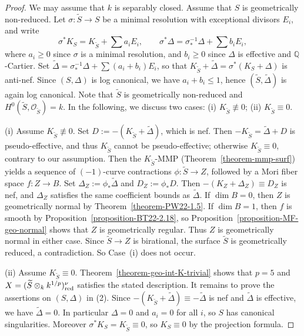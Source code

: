 \documentclass[reqno,oneside]{amsart}
\theoremstyle{definition}
\theoremstyle{plain}
\numberwithin{equation}{section}
\begin{document}
\begin{proof}
  We may assume that $k$ is separably closed.
  Assume that $S$ is geometrically non-reduced.
  Let $\sigma\colon\widetilde S\to S$ be a minimal resolution with exceptional divisors $E_i$, and write
  \[
    \sigma^*K_S = K_{\widetilde S} + \sum a_i E_i, \qquad \sigma^*\Delta = \sigma_*^{-1}\Delta + \sum b_i E_i,
  \]
  where $a_i\ge0$ since $\sigma$ is a minimal resolution, and $b_i\ge0$ since $\Delta$ is effective and $\mathbb Q$-Cartier.
  Set $\widetilde{\Delta} = \sigma_*^{-1}\Delta + \sum (a_i + b_i) E_i$, so that $K_{\widetilde S} + \widetilde{\Delta} = \sigma^*(K_S + \Delta)$ is anti-nef.
  Since $(S,\Delta)$ is log canonical, we have $a_i + b_i \le 1$, hence $(\widetilde S,\widetilde{\Delta})$ is again log canonical.
  Note that $\widetilde S$ is geometrically non-reduced and $H^0(\widetilde S,\mathcal O_{\widetilde S}) = k$.
  In the following, we discuss two cases: (i) $K_{\widetilde S} \not\equiv 0$; (ii) $K_{\widetilde S} \equiv 0$.

  (i) Assume $K_{\widetilde S} \not\equiv 0$.
  Set $D := -(K_{\widetilde S} + \widetilde{\Delta})$, which is nef.
  Then $-K_{\widetilde S} = \widetilde{\Delta} + D$ is pseudo-effective, and thus $K_{\widetilde S}$ cannot be pseudo-effective; otherwise $K_{\widetilde S}\equiv0$, contrary to our assumption.
  Then the $K_{\widetilde S}$-MMP (Theorem~\ref{theorem-mmp-surf}) yields a sequence of $(-1)$-curve contractions $\phi\colon \widetilde S\to Z$, followed by a Mori fiber space $f\colon Z \to B$.
  Set $\Delta_Z:=\phi_*\widetilde{\Delta}$ and $D_Z:=\phi_*D$. Then $-(K_Z+\Delta_Z)\equiv D_Z$ is nef, and $\Delta_Z$ satisfies the same coefficient bounds as $\widetilde{\Delta}$.
  If $\dim B=0$, then $Z$ is geometrically normal by Theorem~\ref{theorem-PW22-1.5}.
  If $\dim B=1$, then $f$ is smooth by Proposition~\ref{proposition-BT22-2.18}, so Proposition~\ref{proposition-MF-geo-normal} shows that $Z$ is geometrically regular.
  Thus $Z$ is geometrically normal in either case.
  Since $\widetilde S\to Z$ is birational, the surface $\widetilde S$ is geometrically reduced, a contradiction.
  So Case~(i) does not occur.

  (ii) Assume $K_{\widetilde S} \equiv 0$.
  Theorem~\ref{theorem-geo-int-K-trivial} shows that $p=5$ and $X = (\widetilde S\otimes_{k} k^{1/p})_{\rm red}^{\nu}$ satisfies the stated description.
  It remains to prove the assertions on $(S,\Delta)$ in (2).
  Since $-(K_{\widetilde S} + \widetilde{\Delta}) \equiv -\widetilde{\Delta}$ is nef and $\widetilde{\Delta}$ is effective, we have $\widetilde{\Delta} = 0$.
  In particular $\Delta = 0$ and $a_i = 0$ for all $i$, so $S$ has canonical singularities.
  Moreover $\sigma^*K_S = K_{\widetilde S} \equiv 0$, so $K_S\equiv0$ by the projection formula.
\end{proof}
\end{document}
